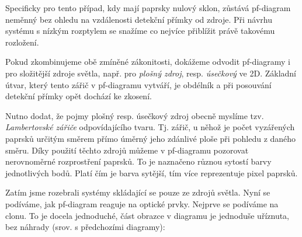 

Specificky pro tento případ, kdy mají paprsky nulový sklon, zůstává pf-diagram neměnný bez ohledu na vzdálenosti detekční přímky od zdroje. Při návrhu systému s nízkým rozptylem se snažíme co nejvíce přiblížit právě takovému rozložení.

Pokud zkombinujeme obě zmíněné zákonitosti, dokážeme odvodit pf-diagramy i pro složitější zdroje světla, např. pro \emph{plošný zdroj}, resp. \emph{úsečkový} ve 2D. Základní útvar, který tento zářič v pf-diagramu vytváří, je obdélník a při posouvání detekční přímky opět dochází ke zkosení.



Nutno dodat, že pojmy plošný resp. úsečkový zdroj obecně myslíme tzv. \emph{Lambertovské zářiče} odpovídajícího tvaru. Tj. zářič, u něhož je počet vyzářených paprsků určitým směrem přímo úměrný jeho zdánlivé ploše při pohledu z daného směru. Díky použití těchto zdrojů můžeme v pf-diagramu pozorovat nerovnoměrné rozprostření paprsků. To je naznačeno různou sytostí barvy jednotlivých bodů. Platí čím je barva sytější, tím více reprezentuje pixel paprsků.

Zatím jsme rozebrali systémy skládající se pouze ze zdrojů světla. Nyní se podíváme, jak pf-diagram reaguje na optické prvky. Nejprve se podíváme na clonu. To je docela jednoduché, část obrazce v diagramu je jednoduše uříznuta, bez náhrady (srov. s předchozími diagramy):

